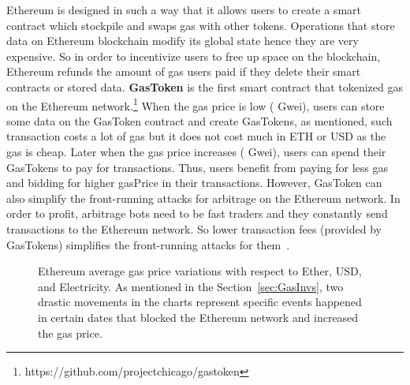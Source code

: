 Ethereum is designed in such a way that it allows users to create a smart contract which stockpile and swaps gas with other tokens. Operations that store data on Ethereum blockchain modify its global state hence they are very expensive. So in order to incentivize users to free up space on the blockchain, Ethereum refunds the amount of gas users paid if they delete their smart contracts or stored data. \textbf{GasToken} is the first smart contract that tokenized gas on the Ethereum network.\footnote{https://github.com/projectchicago/gastoken} When the gas price is low ( Gwei), users can store some data on the GasToken contract and create GasTokens, as mentioned, such transaction costs a lot of gas but it does not cost much in ETH or USD as the gas is cheap. Later when the gas price increases ( Gwei), users can spend their GasTokens to pay for transactions. Thus, users benefit from paying for less gas and bidding for higher \textsf{gasPrice} in their transactions. However, GasToken can also simplify the front-running attacks for arbitrage on the Ethereum network. In order to profit, arbitrage bots need to be fast traders and they constantly send transactions to the Ethereum network. So lower transaction fees (provided by GasTokens) simplifies the front-running attacks for them~\cite{Eskandari2019SoKTD}.


\begin{figure}[!htb]

	\centering
	\hfill
	\caption {Ethereum average gas price variations with respect to Ether, USD, and Electricity. As mentioned in the Section~\ref{sec:GasInvs}, two drastic movements in the charts represent specific events happened in certain dates  that blocked the Ethereum network and increased the gas price.}
	\label{fig:gas}

\end{figure}

